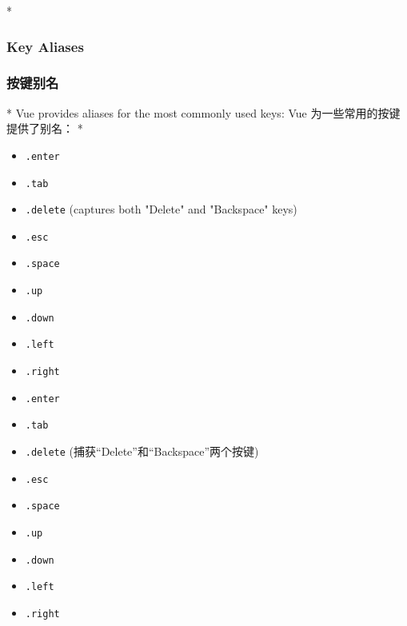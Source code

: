 \begin{paracol}{2}

\switchcolumn[0]*%
\subsubsection{Key Aliases}
\switchcolumn
\subsubsection{按键别名}
\switchcolumn[0]*%
Vue provides aliases for the most commonly used keys:
\switchcolumn
Vue 为一些常用的按键提供了别名：
\switchcolumn[0]*%
\begin{itemize}
\item
    \texttt{.enter}
\item
    \texttt{.tab}
\item
    \texttt{.delete} (captures both "Delete" and "Backspace" keys)
\item
    \texttt{.esc}
\item
    \texttt{.space}
\item
    \texttt{.up}
\item
    \texttt{.down}
\item
    \texttt{.left}
\item
    \texttt{.right}
\end{itemize}
\switchcolumn
\begin{itemize}
\item
    \texttt{.enter}
\item
    \texttt{.tab}
\item
    \texttt{.delete} (捕获``Delete''和``Backspace''两个按键)
\item
    \texttt{.esc}
\item
    \texttt{.space}
\item
    \texttt{.up}
\item
    \texttt{.down}
\item
    \texttt{.left}
\item
    \texttt{.right}
\end{itemize}
\end{paracol}


